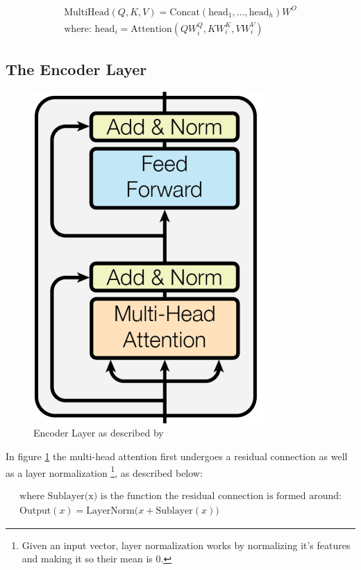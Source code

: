 \documentclass{article}
\begin{document}
\begin{gather*}
\text{MultiHead}(Q, K, V) = \text{Concat}(\text{head}_1, ..., \text{head}_h) W^O \\
\text{where: } \text{head}_i = \text{Attention}(Q W_i^Q, K W_i^K, V W_i^V)
\end{gather*}

\newpage
\subsection{The Encoder Layer}

\begin{figure}
    \centering
    \includegraphics[width=0.2\paperwidth]{images/encodingLayer.png}
    \caption{Encoder Layer as described by \cite{vaswani2023attentionneed}}
    \label{fig:encodingLayer}
\end{figure}

In figure \ref{fig:encodingLayer} the multi-head attention first undergoes 
a residual connection as well as a layer normalization \footnote{Given an input 
vector, layer normalization works by normalizing it's features and making it so 
their mean is 0.}, as described below:

\begin{gather}
    \text{where Sublayer(x) is the function the residual connection is formed 
    around:} \nonumber \\
    \text{Output}(x) = \text{LayerNorm}\bigl(x + \text{Sublayer}(x)\bigr) \label{eq:ResConnect}
\end{gather}
\end{document}
